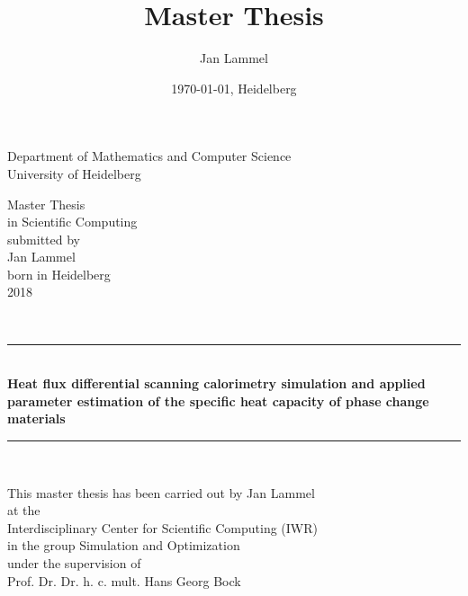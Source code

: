 \documentclass{scrartcl}[12pt, halfparskip]
\title{Master Thesis}
\author{Jan Lammel}
\date{\today{}, Heidelberg}
\numberwithin{equation}{section}
\numberwithin{figure}{section}
\numberwithin{table}{section}
\begin{document}


\begin{titlepage}
	\begin{center}
		
	\Large{Department of Mathematics and Computer Science} \\[3ex]
	
	University of Heidelberg \\
	
	\vspace{13cm}
	
	Master Thesis \\[0.5ex]
	in Scientific Computing \\[2ex]
	submitted by \\[2ex]
	Jan Lammel \\[0.5ex]
	born in Heidelberg \\[3ex]
	2018 \\[2ex]
		
	\end{center}
\end{titlepage}


\newpage 

\begin{titlepage}
	\mbox{}\\
\end{titlepage}

\begin{titlepage}
	\begin{center}
		\newcommand{\HRule}{\rule{\linewidth}{0.5mm}}
		\HRule \\[0.1cm]
		{\huge \bfseries Heat flux differential scanning calorimetry simulation and applied parameter estimation of the specific heat capacity of phase change materials}
		\HRule \\[0.3cm]
		
		\vspace{10cm}
		
		{\Large This master thesis has been carried out by Jan Lammel \\[2ex]
		at the \\[2ex]
		Interdisciplinary Center for Scientific Computing (IWR)\\ 
		in the group Simulation and Optimization \\[3ex]
		under the supervision of \\[3ex]
		Prof. Dr. Dr. h. c. mult. Hans Georg Bock}
	\end{center}
\end{titlepage}
\end{document}
